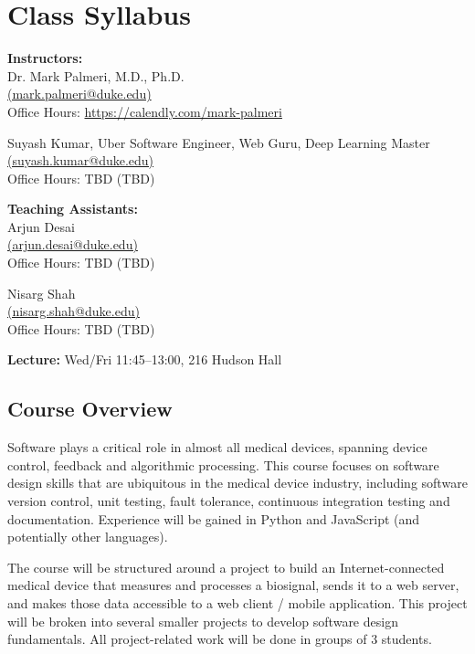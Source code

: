 



\section*{Class Syllabus}

{\bf Instructors:}\\
Dr. Mark Palmeri, M.D., Ph.D.\\
\href{mailto:mark.palmeri@duke.edu}{(mark.palmeri@duke.edu)}\\
Office Hours: \url{https://calendly.com/mark-palmeri}

Suyash Kumar, Uber Software Engineer, Web Guru, Deep Learning Master\\
\href{mailto:suyash.kumar@duke.edu}{(suyash.kumar@duke.edu)}\\
Office Hours: TBD (TBD)

{\bf Teaching Assistants:}\\
Arjun Desai\\
\href{mailto:arjun.desai@duke.edu}{(arjun.desai@duke.edu)}\\
Office Hours: TBD (TBD)

Nisarg Shah\\
\href{mainto:nisarg.shah@duke.edu}{(nisarg.shah@duke.edu)}\\
Office Hours: TBD (TBD)

{\bf Lecture:} Wed/Fri 11:45--13:00, 216 Hudson Hall

\subsection*{Course Overview}
Software plays a critical role in almost all medical devices, spanning device
control, feedback and algorithmic processing.  This course focuses on software
design skills that are ubiquitous in the medical device industry, including
software version control, unit testing, fault tolerance, continuous integration
testing and documentation.  Experience will be gained in Python and JavaScript
(and potentially other languages).

The course will be structured around a project to build an Internet-connected
medical device that measures and processes a biosignal, sends it to a web
server, and makes those data accessible to a web client / mobile application.
This project will be broken into several smaller projects to develop software
design fundamentals.  All project-related work will be done in groups of 3
students.

